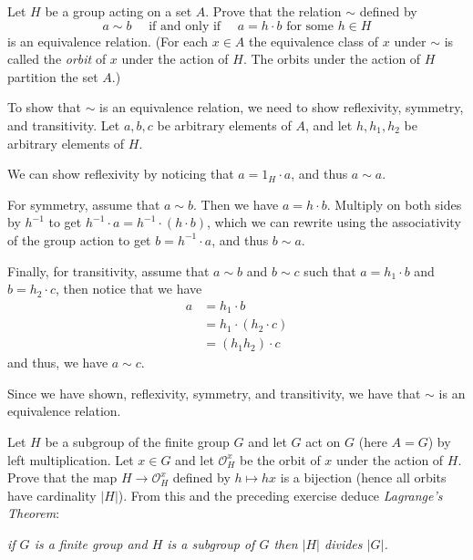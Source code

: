 \documentclass[12 pt, letterpaper]{hmcpset}
\begin{document}
\pagebreak

\begin{problem}
	Let $H$ be a group acting on a set $A$. Prove that the relation $\sim$ defined by 
	\[
		a \sim b \quad \text{ if and only if } \quad a = h \cdot b \text{ for some } h \in H
	\]
	is an equivalence relation. (For each $x \in A$ the equivalence class of $x$ under $\sim$ is called the \textit{orbit} of $x$ under the action of $H$. The orbits under the action of $H$ partition the set $A$.)
\end{problem}

\begin{solution}
	To show that $\sim$ is an equivalence relation, we need to show reflexivity, symmetry, and transitivity. Let $a, b, c$ be arbitrary elements of $A$, and let $h, h_1, h_2$ be arbitrary elements of $H$.

	We can show reflexivity by noticing that $a = 1_H \cdot a$, and thus $a \sim a$. 

	For symmetry, assume that $a \sim b$. Then we have $a = h \cdot b$. Multiply on both sides by $h^{-1}$ to get $h^{-1} \cdot a = h^{-1} \cdot (h \cdot b)$, which we can rewrite using the associativity of the group action to get $b = h^{-1} \cdot a$, and thus $b \sim a$. 

	Finally, for transitivity, assume that $a \sim b$ and $b \sim c$ such that $a = h_1 \cdot b$ and $b = h_2 \cdot c$, then notice that we have
	\[
		\begin{split}
			a & = h_1 \cdot b \\
			  & = h_1 \cdot (h_2 \cdot c) \\
			  & = (h_1 h_2) \cdot c
		\end{split}
	\]
	and thus, we have $a \sim c$. 

	Since we have shown, reflexivity, symmetry, and transitivity, we have that $\sim$ is an equivalence relation.
\end{solution}

\pagebreak

\begin{problem}
	Let $H$ be a subgroup of the finite group $G$ and let $G$ act on $G$ (here $A = G$) by left multiplication. Let $x \in G$ and let $\mathcal{O}_H^x$ be the orbit of $x$ under the action of $H$. Prove that the map $H \to \mathcal{O}_H^x$ defined by $h \mapsto hx$ is a bijection (hence all orbits have cardinality $\lvert H \rvert$). From this and the preceding exercise deduce \textit{Lagrange's Theorem}:
	\begin{center}
		\textit{if $G$ is a finite group and $H$ is a subgroup of $G$ then $\lvert H \rvert$ divides $\lvert G \rvert$.}
	\end{center}
\end{problem}
\end{document}
